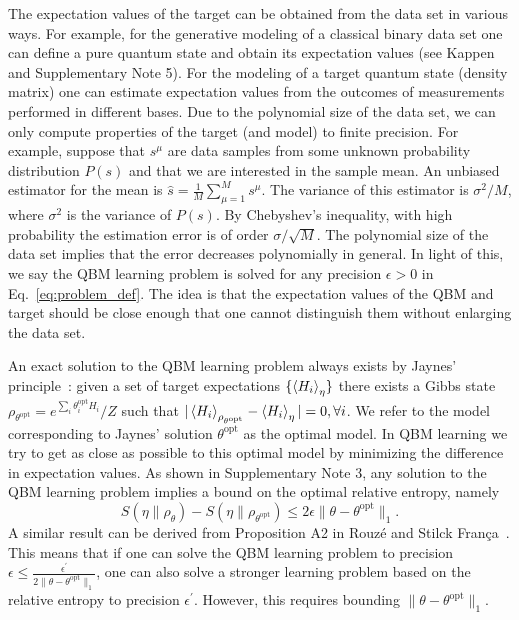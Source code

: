\documentclass[
    reprint,
    aps,
    prx,
    longbibliography
]{revtex4-2}
\begin{document}
The expectation values of the target can be obtained from the data set in various ways. For example, for the generative modeling of a classical binary data set one can define a pure quantum state and obtain its expectation values (see Kappen~\cite{Kappen_2020} and Supplementary Note 5).
For the modeling of a target quantum state (density matrix) one can estimate expectation values from the outcomes of measurements performed in different bases.
Due to the polynomial size of the data set, we can only compute properties of the target (and model) to finite precision. For example, suppose that $s^\mu$ are data samples from some unknown probability distribution $P(s)$ and that we are interested in the sample mean. An unbiased estimator for the mean is $\hat{s} = \frac{1}{M}\sum_{\mu=1}^M s^\mu$. The variance of this estimator is $\sigma^2/M$, where $\sigma^2$ is the variance of $P(s)$. By Chebyshev's inequality, with high probability the estimation error is of order $\sigma/\sqrt{M}$. The polynomial size of the data set implies that the error decreases polynomially in general. In light of this, we say the QBM learning problem is solved for any precision $\epsilon > 0$ in Eq.~\eqref{eq:problem_def}. The idea is that the expectation values of the QBM and target should be close enough that one cannot distinguish them without enlarging the data set.

An exact solution to the QBM learning problem always exists by Jaynes' principle~\cite{jaynes1957}: given a set of target expectations $\{ \expval{H_i}_\eta \}$ there exists a Gibbs state $\rho_{\theta^{\mathrm{opt}}} = e^{\sum_i \theta^{\mathrm{opt}}_i H_i}/Z$ such that $| \expval{H_i}_{\rho_{\theta^{\mathrm{opt}}}} - \expval{H_i}_\eta |= 0, \forall i$. We refer to the model corresponding to Jaynes' solution $\theta^{\mathrm{opt}}$ as the optimal model. In QBM learning we try to get as close as possible to this optimal model by minimizing the difference in expectation values. As shown in Supplementary Note 3, any solution to the QBM learning problem implies a bound on the optimal relative entropy, namely 
\begin{equation}
\label{eq:relentropbound}
    S(\eta\|\rho_{\theta}) -  S(\eta\|\rho_{\theta^{\mathrm{opt}}}) \leq 2 \epsilon \| \theta - \theta^\textrm{opt} \|_1 .
\end{equation} 
A similar result can be derived from Proposition A2 in Rouz\'{e} and Stilck Fran\c{c}a~\cite{Rouze_2023}. This means that if one can solve the QBM learning problem to precision $\epsilon \leq \frac{\epsilon^\prime}{2\| \theta - \theta^\textrm{opt} \|_1}$, one can also solve a stronger learning problem based on the relative entropy to precision $\epsilon^\prime$. However, this requires bounding $\| \theta - \theta^\textrm{opt} \|_1$.
\end{document}
